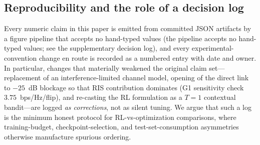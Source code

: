 \subsection{Reproducibility and the role of a decision log}
\label{sec:repro}

Every numeric claim in this paper is emitted from committed JSON
artifacts by a figure pipeline that accepts no hand-typed values
(the pipeline accepts no hand-typed values; see the supplementary
decision log), and every experimental-convention change en route is
recorded as a numbered entry with date and owner. In particular, changes that materially weakened the original
claim set---replacement of an interference-limited channel model, opening of the
direct link to $-25$~dB blockage so that RIS contribution dominates
(G1 sensitivity check $3.75$~bps/Hz/flip), and re-casting the RL
formulation as a $T{=}1$ contextual bandit---are logged \emph{as corrections}, not as
silent tuning. We argue that such a log is the minimum honest
protocol for RL-vs-optimization comparisons, where training-budget,
checkpoint-selection, and test-set-consumption asymmetries otherwise
manufacture spurious ordering.
